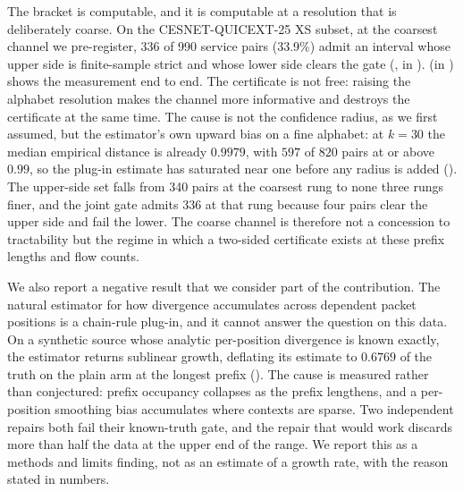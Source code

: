 The bracket is computable, and it is computable at a resolution that is
deliberately coarse. On the CESNET-QUICEXT-25 XS subset, at the coarsest channel
we pre-register, 336 of 990 service pairs (33.9\%) admit an interval whose upper
side is finite-sample strict and whose lower side clears the gate
(, in ).  (in ) shows the measurement end to end. The
certificate is not free: raising the alphabet resolution makes the channel more
informative and destroys the certificate at the same time. The cause is not the
confidence radius, as we first assumed, but the estimator's own upward bias on a
fine alphabet: at $k{=}30$ the median empirical distance is already $0.9979$,
with $597$ of $820$ pairs at or above $0.99$, so the plug-in estimate has
saturated near one before any radius is added (). The
upper-side set falls from 340 pairs at the coarsest rung to none three rungs
finer, and the joint gate admits 336 at that rung because four pairs clear the
upper side and fail the lower. The coarse channel is therefore not a concession
to tractability but the regime in which a two-sided certificate exists at these
prefix lengths and flow counts.

We also report a negative result that we consider part of the contribution. The
natural estimator for how divergence accumulates across dependent packet
positions is a chain-rule plug-in, and it cannot answer the question on this
data. On a synthetic source whose analytic per-position divergence is known
exactly, the estimator returns sublinear growth, deflating its estimate to
$0.6769$ of the truth on the plain arm at the longest prefix
(). The cause is measured rather than conjectured: prefix
occupancy collapses as the prefix lengthens, and a per-position smoothing bias
accumulates where contexts are sparse. Two independent repairs both fail their
known-truth gate, and the repair that would work discards more than half the data
at the upper end of the range. We report this as a methods and limits finding,
not as an estimate of a growth rate, with the reason stated in numbers.

